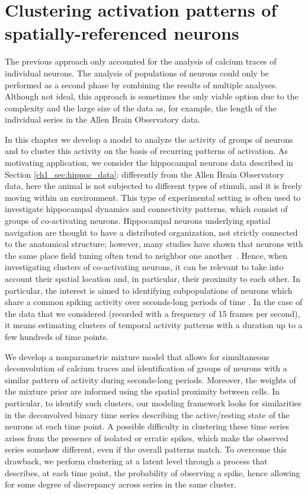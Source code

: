 \chapter{Clustering activation patterns of spatially-referenced neurons}

The previous approach only accounted for the analysis of calcium traces of individual neurons. The analysis of populations of neurons could only be performed as a second phase by combining the results of multiple analyses.
Although not ideal, this approach is sometimes the only viable option due to the complexity and the large size of the data as, for example, the length of the individual series in the Allen Brain Observatory data.

In this chapter we develop a model to analyze the activity of groups of neurons and to cluster this activity on the basis of recurring patterns of activation. As motivating application, we consider the hippocampal neurons data described in Section \ref{ch1_sec:hippoc_data}: differently from the Allen Brain Observatory data, here the animal is not subjected to different types of stimuli, and it is freely moving within an environment.
This type of experimental setting is often used to investigate hippocampal dynamics and connectivity patterns, which consist of groups of co-activating neurons. 
Hippocampal neurons underlying spatial navigation are thought to have a distributed organization, not strictly connected to the anatomical structure; however, many studies have shown that neurons with the same place field tuning often tend to neighbor one another~\parencite{Eichenbaum1989, Redish2001}. Hence, when investigating clusters of co-activating neurons, it can be relevant to take into account their spatial location and, in particular, their proximity to each other.
In particular, the interest is aimed to identifying subpopulations of neurons which share a common spiking activity over seconds-long periods of time \parencite{Bittner2017}. In the case of the data that we considered (recorded with a frequency of 15 frames per second), it means estimating clusters of temporal activity patterns with a duration up to a few hundreds of time points.

We develop a nonparametric mixture model that allows for simultaneous deconvolution of calcium traces and identification of groups of neurons with a similar pattern of activity during seconds-long periods. Moreover, the weights of the mixture prior are informed using the spatial proximity between cells. In particular, to identify such clusters, our modeling framework looks for similarities in the deconvolved binary time series describing the active/resting state of the neurons at each time point.
A possible difficulty in clustering these time series arises from the presence of isolated or erratic spikes, which make the observed series somehow different, even if the overall patterns match. To overcome this drawback, we perform clustering at a latent level through a process that describes, at each time point, the probability of observing a spike, hence allowing for some degree of discrepancy across series in the same cluster.


